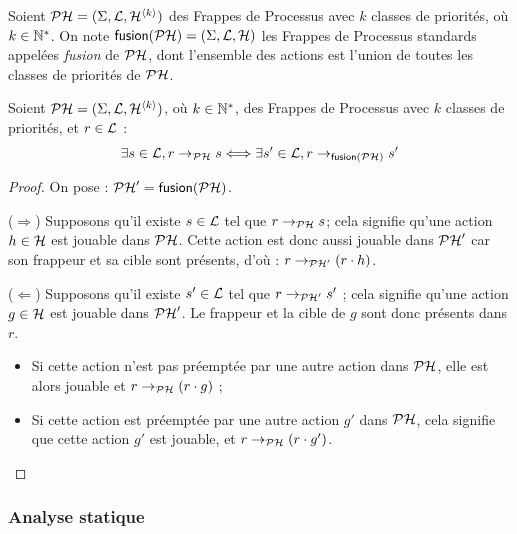 \begin{definition}
  Soient $\mathcal{PH} = (\Sigma, \mathcal{L}, \mathcal{H}^{{\langle k \rangle}})$ des Frappes de Processus avec $k$
  classes de priorités, où $k \in \mathbb{N}^*$.
  On note $\mathsf{fusion}(\mathcal{PH}) = (\Sigma, \mathcal{L}, \mathcal{H})$
  les Frappes de Processus standards appelées \emph{fusion} de $\mathcal{PH}$,
  dont l'ensemble des actions est l'union de toutes les classes de priorités de $\mathcal{PH}$.
\end{definition}

\begin{theorem}
  Soient $\mathcal{PH} = (\Sigma, \mathcal{L}, \mathcal{H}^{{\langle k \rangle}})$, où $k \in \mathbb{N}^*$,
  des Frappes de Processus avec $k$ classes de priorités,
  et $r \in \mathcal{L}$ :
  \[\exists s \in \mathcal{L}, r \rightarrow_{\mathcal{PH}} s \Longleftrightarrow
    \exists s' \in \mathcal{L}, r \rightarrow_{\mathsf{fusion}(\mathcal{PH})} s'\]
\end{theorem}

\begin{proof}
  On pose : $\mathcal{PH}' = \mathsf{fusion}(\mathcal{PH})$.

  ($\Rightarrow$) Supposons qu'il existe $s \in \mathcal{L}$ tel que $r \rightarrow_{\mathcal{PH}} s$;
    cela signifie qu'une action $h \in \mathcal{H}$ est jouable dans $\mathcal{PH}$.
    Cette action est donc aussi jouable dans $\mathcal{PH}'$ car son frappeur et sa cible sont présents,
    d'où : $r \rightarrow_{\mathcal{PH}'} (r \cdot h)$.
    
  ($\Leftarrow$) Supposons qu'il existe $s' \in \mathcal{L}$ tel que $r \rightarrow_{\mathcal{PH}'} s'$ ;
    cela signifie qu'une action $g \in \mathcal{H}$ est jouable dans $\mathcal{PH}'$.
    Le frappeur et la cible de $g$ sont donc présents dans $r$.
    \begin{itemize}
      \item Si cette action n'est pas préemptée par une autre action dans $\mathcal{PH}$,
        elle est alors jouable et $r \rightarrow_{\mathcal{PH}} (r \cdot g)$ ;
      \item Si cette action est préemptée par une autre action $g'$ dans $\mathcal{PH}$,
        cela signifie que cette action $g'$ est jouable, et $r \rightarrow_{\mathcal{PH}} (r \cdot g')$.
        \qedhere
    \end{itemize}
\end{proof}

\subsubsection{Analyse statique}

